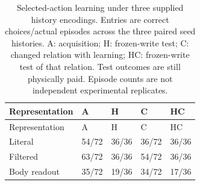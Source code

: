 \begingroup\small
\begin{longtable}{lllll}
\caption{Selected-action learning under three supplied history encodings. Entries are correct choices/actual episodes across the three paired seed histories. A: acquisition; H: frozen-write test; C: changed relation with learning; HC: frozen-write test of that relation. Test outcomes are still physically paid. Episode counts are not independent experimental replicates.}\label{tab:history-main}\\
\toprule
Representation & A & H & C & HC \\
\midrule
\endfirsthead
\toprule
Representation & A & H & C & HC \\
\midrule
\endhead
Literal & 54/72 & 36/36 & 36/72 & 36/36 \\
Filtered & 63/72 & 36/36 & 54/72 & 36/36 \\
Body readout & 35/72 & 19/36 & 34/72 & 17/36 \\
\bottomrule
\end{longtable}
\endgroup
